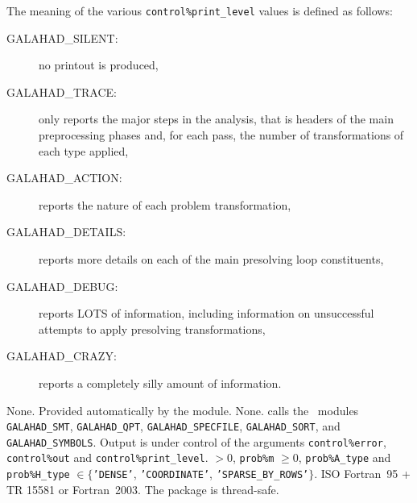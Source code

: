 \documentclass{galahad}
\newcommand{\packagename}{PRESOLVE}
\newcommand{\sym}{\sf\small}
\begin{document}

\galinfo
The meaning of the various {\tt control\%print\_level} values is defined as
follows:
\begin{description}
\item[\sym GALAHAD\_SILENT:] no printout is produced,
\item[\sym GALAHAD\_TRACE:] only reports the major steps in the analysis, that is
headers of the main preprocessing phases and, for each pass, the number of
transformations of each type applied,
\item[\sym GALAHAD\_ACTION:] reports the nature of each problem transformation,
\item[\sym GALAHAD\_DETAILS:] reports more details on each of the main presolving loop
constituents, 
\item[\sym GALAHAD\_DEBUG:] reports LOTS of information, including information on
unsuccessful attempts to apply presolving transformations,
\item[\sym GALAHAD\_CRAZY:] reports a completely silly amount of information.
\end{description}


\galgeneral

\galcommon None.
\galworkspace Provided automatically by the module.
\galroutines None. 
\galmodules {\tt \packagename} calls the \galahad\ modules
{\tt GALAHAD\_SMT}, {\tt GALAHAD\_QPT}, 
{\tt GALAHAD\_SPECFILE}, {\tt GALAHAD\_SORT},
and {\tt GALAHAD\_SYMBOLS}.
\galio Output is under control of the arguments
 {\tt control\%error}, {\tt control\%out} and {\tt control\%print\_level}.
 $> 0$, {\tt prob\%m} $\geq  0$, 
{\tt prob\%A\_type} and {\tt prob\%H\_type} $\in \{${\tt 'DENSE'}, 
 {\tt 'COORDINATE'}, {\tt 'SPARSE\_BY\_ROWS'}$\}$. 
\galportability ISO Fortran~95 + TR 15581 or Fortran~2003. 
The package is thread-safe.

\end{document}
